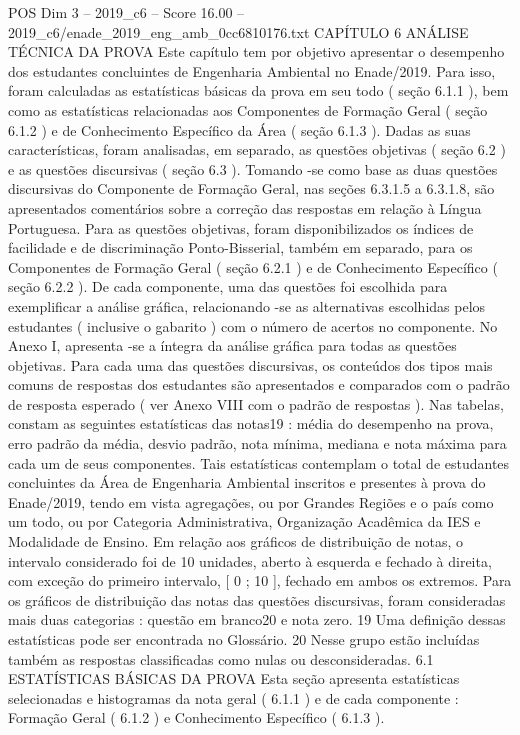 \begin{textsample}{POS Dim 3 – 2019\_c6 – Score 16.00 – 2019\_c6/enade\_2019\_eng\_amb\_0cc6810176.txt}  \label{ex:f3_pos_016}
CAPÍTULO 6 ANÁLISE TÉCNICA DA PROVA Este capítulo tem por objetivo apresentar o desempenho dos estudantes concluintes de Engenharia Ambiental no Enade/2019.
Para isso, foram calculadas as estatísticas básicas da prova em seu todo ( seção 6.1.1 ), bem como as estatísticas relacionadas aos Componentes de Formação Geral ( seção 6.1.2 ) e de Conhecimento Específico da Área ( seção 6.1.3 ).
Dadas as suas características, foram analisadas, em separado, as questões objetivas ( seção 6.2 ) e as questões discursivas ( seção 6.3 ).
Tomando -se como base as duas questões discursivas do Componente de Formação Geral, nas seções 6.3.1.5 a 6.3.1.8, são apresentados comentários sobre a correção das respostas em relação à Língua Portuguesa.
Para as questões objetivas, foram disponibilizados os índices de facilidade e de discriminação Ponto-Bisserial, também em separado, para os Componentes de Formação Geral ( seção 6.2.1 ) e de Conhecimento Específico ( seção 6.2.2 ).
De cada componente, uma das questões foi escolhida para exemplificar a análise gráfica, relacionando -se as alternativas escolhidas pelos estudantes ( inclusive o gabarito ) com o número de acertos no componente.
No Anexo I, apresenta -se a íntegra da análise gráfica para todas as questões objetivas.
Para cada uma das questões discursivas, os conteúdos dos tipos mais comuns de respostas dos estudantes são apresentados e comparados com o padrão de resposta esperado ( ver Anexo VIII com o padrão de respostas ).
Nas tabelas, constam as seguintes estatísticas das notas19 : média do desempenho na prova, erro padrão da média, desvio padrão, nota mínima, mediana e nota máxima para cada um de seus componentes.
Tais estatísticas contemplam o total de estudantes concluintes da Área de Engenharia Ambiental inscritos e presentes à prova do Enade/2019, tendo em vista agregações, ou por Grandes Regiões e o país como um todo, ou por Categoria Administrativa, Organização Acadêmica da IES e Modalidade de Ensino.
Em relação aos gráficos de distribuição de notas, o intervalo considerado foi de 10 unidades, aberto à esquerda e fechado à direita, com exceção do primeiro intervalo, [ 0 ; 10 ], fechado em ambos os extremos.
Para os gráficos de distribuição das notas das questões discursivas, foram consideradas mais duas categorias : questão em branco20 e nota zero. 19 Uma definição dessas estatísticas pode ser encontrada no Glossário. 20 Nesse grupo estão incluídas também as respostas classificadas como nulas ou desconsideradas. 6.1 ESTATÍSTICAS BÁSICAS DA PROVA Esta seção apresenta estatísticas selecionadas e histogramas da nota geral ( 6.1.1 ) e de cada componente : Formação Geral ( 6.1.2 ) e Conhecimento Específico ( 6.1.3 ).

\end{textsample}
